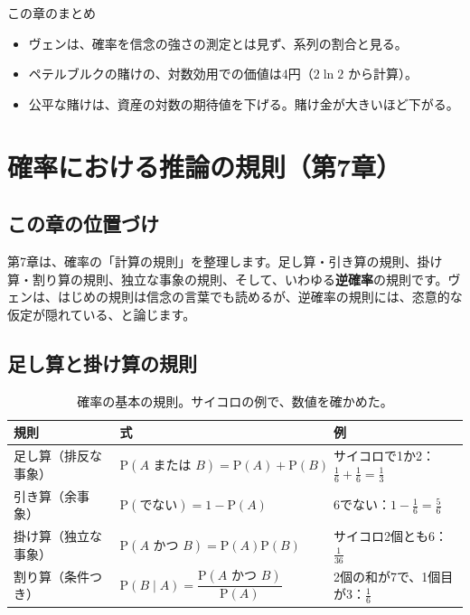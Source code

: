 \documentclass[a4paper,11pt,openany]{ltjsbook}
\newcommand{\Prob}{\mathrm{P}}
\begin{document}
\begin{pointbox}{この章のまとめ}
\begin{itemize}[leftmargin=*]
\item ヴェンは、確率を信念の強さの測定とは見ず、系列の割合と見る。
\item ペテルブルクの賭けの、対数効用での価値は4円（$2\ln2$ から計算）。
\item 公平な賭けは、資産の対数の期待値を下げる。賭け金が大きいほど下がる。
\end{itemize}
\end{pointbox}

\chapter{確率における推論の規則（第7章）}

\section{この章の位置づけ}

第7章は、確率の「計算の規則」を整理します。足し算・引き算の規則、掛け算・割り算の規則、独立な事象の規則、そして、いわゆる\textbf{逆確率}の規則です。ヴェンは、はじめの規則は信念の言葉でも読めるが、逆確率の規則には、恣意的な仮定が隠れている、と論じます。

\section{足し算と掛け算の規則}

\begin{table}[htbp]
\centering
\begin{tabular}{lll}
\toprule
規則 & 式 & 例\\
\midrule
足し算（排反な事象） & $\Prob(A\text{ または }B)=\Prob(A)+\Prob(B)$ & サイコロで1か2：$\tfrac16+\tfrac16=\tfrac13$\\
引き算（余事象） & $\Prob(\text{でない})=1-\Prob(A)$ & 6でない：$1-\tfrac16=\tfrac56$\\
掛け算（独立な事象） & $\Prob(A\text{ かつ }B)=\Prob(A)\Prob(B)$ & サイコロ2個とも6：$\tfrac1{36}$\\
割り算（条件つき） & $\Prob(B\mid A)=\dfrac{\Prob(A\text{ かつ }B)}{\Prob(A)}$ & 2個の和が7で、1個目が3：$\tfrac16$\\
\bottomrule
\end{tabular}
\caption{確率の基本の規則。サイコロの例で、数値を確かめた。}
\end{table}
\end{document}
